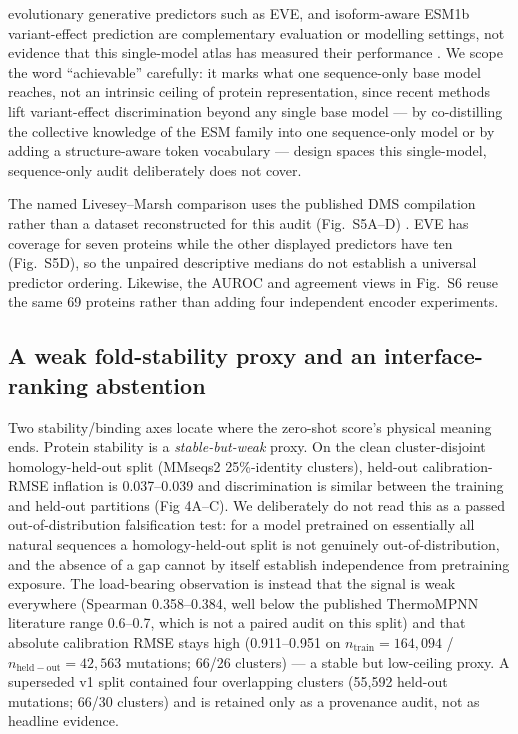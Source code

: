 \documentclass[12pt]{article}
\begin{document}
evolutionary generative predictors such as EVE, and isoform-aware ESM1b variant-effect prediction are complementary evaluation or modelling settings, not evidence that this single-model atlas has measured their performance \citep{Dallago2021FLIP,Chungyoun2024FLAb,Frazer2021EVE,Brandes2023ESM1b}. We scope the word ``achievable'' carefully: it marks what one sequence-only base model reaches, not an intrinsic ceiling of protein representation, since recent methods lift variant-effect discrimination beyond any single base model --- by co-distilling the collective knowledge of the ESM family into one sequence-only model \citep{Dinh2026VESM} or by adding a structure-aware token vocabulary \citep{Su2024SaProt} --- design spaces this single-model, sequence-only audit deliberately does not cover.

The named Livesey--Marsh comparison uses the published DMS compilation rather than a dataset reconstructed for this audit (Fig.~S5A--D) \citep{Livesey2020}.
EVE has coverage for seven proteins while the other displayed predictors
have ten (Fig.~S5D), so the unpaired descriptive medians do not establish
a universal predictor ordering. Likewise, the AUROC and agreement views
in Fig.~S6 reuse the same 69 proteins rather than adding four independent
encoder experiments.



\subsection{A weak fold-stability proxy and an interface-ranking abstention}

Two stability/binding axes locate where the zero-shot score's physical meaning ends. Protein stability is a \textit{stable-but-weak} proxy. On the clean cluster-disjoint homology-held-out split (MMseqs2 25\%-identity clusters), held-out calibration-RMSE inflation is 0.037--0.039 and discrimination is similar between the training and held-out partitions (Fig 4A--C). We deliberately do not read this as a passed out-of-distribution falsification test: for a model pretrained on essentially all natural sequences a homology-held-out split is not genuinely out-of-distribution, and the absence of a gap cannot by itself establish independence from pretraining exposure. The load-bearing observation is instead that the signal is weak everywhere (Spearman 0.358--0.384, well below the published ThermoMPNN literature range 0.6--0.7, which is not a paired audit on this split) and that absolute calibration RMSE stays high (0.911--0.951 on $n_{\mathrm{train}}=164{,}094$ / $n_{\mathrm{held-out}}=42{,}563$ mutations; 66/26 clusters) --- a stable but low-ceiling proxy. A superseded v1 split contained four overlapping clusters (55,592 held-out mutations; 66/30 clusters) and is retained only as a provenance audit, not as headline evidence.
\end{document}
